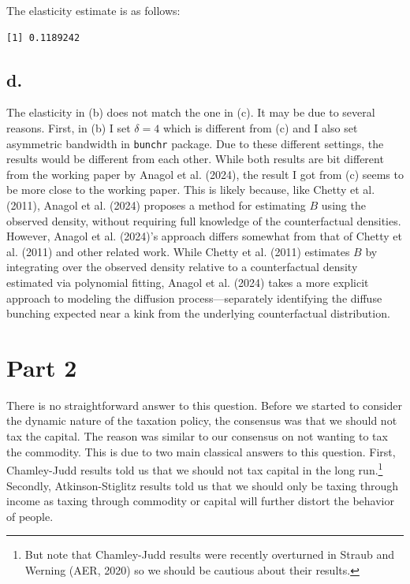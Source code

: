 \documentclass[
  letterpaper,
  DIV=11,
  numbers=noendperiod]{scrartcl}
\newenvironment{Shaded}{\begin{snugshade}}{\end{snugshade}}
\newcommand{\CommentTok}[1]{\textcolor[rgb]{0.37,0.37,0.37}{#1}}
\newcommand{\NormalTok}[1]{\textcolor[rgb]{0.00,0.23,0.31}{#1}}
\newcommand{\SpecialCharTok}[1]{\textcolor[rgb]{0.37,0.37,0.37}{#1}}
\begin{document}
The elasticity estimate is as follows:

\begin{Shaded}
\end{Shaded}

\begin{verbatim}
[1] 0.1189242
\end{verbatim}

\subsection{d.}\label{d.}

The elasticity in (b) does not match the one in (c). It may be due to
several reasons. First, in (b) I set \(\delta=4\) which is different
from (c) and I also set asymmetric bandwidth in \texttt{bunchr} package.
Due to these different settings, the results would be different from
each other. While both results are bit different from the working paper
by Anagol et al. (2024), the result I got from (c) seems to be more
close to the working paper. This is likely because, like Chetty et al.
(2011), Anagol et al. (2024) proposes a method for estimating \(B\)
using the observed density, without requiring full knowledge of the
counterfactual densities. However, Anagol et al. (2024)'s approach
differs somewhat from that of Chetty et al. (2011) and other related
work. While Chetty et al. (2011) estimates \(B\) by integrating over the
observed density relative to a counterfactual density estimated via
polynomial fitting, Anagol et al. (2024) takes a more explicit approach
to modeling the diffusion process---separately identifying the diffuse
bunching expected near a kink from the underlying counterfactual
distribution.

\section{Part 2}\label{part-2}

There is no straightforward answer to this question. Before we started
to consider the dynamic nature of the taxation policy, the consensus was
that we should not tax the capital. The reason was similar to our
consensus on not wanting to tax the commodity. This is due to two main
classical answers to this question. First, Chamley-Judd results told us
that we should not tax capital in the long run.\footnote{But note that
  Chamley-Judd results were recently overturned in Straub and Werning
  (AER, 2020) so we should be cautious about their results.} Secondly,
Atkinson-Stiglitz results told us that we should only be taxing through
income as taxing through commodity or capital will further distort the
behavior of people.
\end{document}
